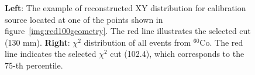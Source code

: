 \documentclass[a4paper,11pt]{article}
\begin{document}
\begin{figure}[htbp]
  \begin{minipage}[ht]{0.45\linewidth}    
  \end{minipage}
  \hfill
  \begin{minipage}[ht]{0.53\linewidth}  
  \end{minipage}
	\caption{\textbf{Left}: The example of reconstructed XY distribution for calibration source located at one of the points shown in figure~\ref{img:red100geometry}. The red line illustrates the selected cut (130 mm).  \textbf{Right}: $\chi^2$ distribution of all events from $^{60}$Co. The red line indicates the selected $\chi^2$ cut (102.4), which corresponds to the 75-th percentile.}
	\label{img:xy and chi2}
\end{figure}
\end{document}
